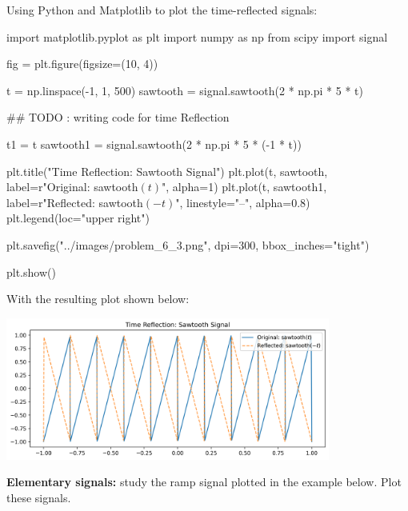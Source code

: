 \documentclass[a4paper, 10pt]{article}
\begin{document}
\begin{solution}
Using Python and Matplotlib to plot the time-reflected signals:
\begin{codingbox}
import matplotlib.pyplot as plt
import numpy as np
from scipy import signal

fig = plt.figure(figsize=(10, 4))

t = np.linspace(-1, 1, 500)
sawtooth = signal.sawtooth(2 * np.pi * 5 * t)

## TODO : writing code for time Reflection

t1 = t
sawtooth1 = signal.sawtooth(2 * np.pi * 5 * (-1 * t))

plt.title("Time Reflection: Sawtooth Signal")
plt.plot(t, sawtooth, label=r"Original: sawtooth$(t)$", alpha=1)
plt.plot(t, sawtooth1, label=r"Reflected: sawtooth$(-t)$", linestyle="--", alpha=0.8)
plt.legend(loc="upper right")

plt.savefig("../images/problem_6_3.png", dpi=300, bbox_inches="tight")

plt.show()
\end{codingbox}

With the resulting plot shown below:
\begin{center}
    \includegraphics[width=0.8\textwidth]{images/problem_6_3.png}
\end{center}
\end{solution}

\newpage

\begin{problem}
\textbf{Elementary signals:} study the ramp signal plotted in the example below.
Plot these signals.
\end{problem}
\end{document}
